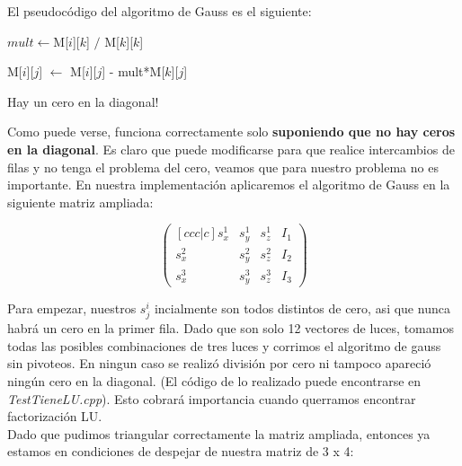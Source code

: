 El pseudocódigo del algoritmo de Gauss es el siguiente:

\begin{algorithm}[H]
\begin{algorithmic}


                \State $mult \gets $M[$i$][$k$] $/$ M[$k$][$k$]

                    \State M[$i$][$j$] $\gets$ M[$i$][$j$] - mult*M[$k$][$j$]

                \EndFor
            \Else
                \State Hay un cero en la diagonal!
            \EndIf
        \EndFor
    \EndFor

\EndFunction
\end{algorithmic}
\end{algorithm}

Como puede verse, funciona correctamente solo \textbf{suponiendo que no hay ceros en la diagonal}. Es claro que puede modificarse para que realice intercambios de filas y no tenga el problema del cero, veamos que para nuestro problema no es importante. En nuestra implementación aplicaremos el algoritmo de Gauss en la siguiente matriz ampliada:

\[
\begin{pmatrix}[ccc|c]
    s_{x}^{1} & s_{y}^{1} & s_{z}^{1} & I_{1} \\
    s_{x}^{2} & s_{y}^{2} & s_{z}^{2} & I_{2} \\
    s_{x}^{3} & s_{y}^{3} & s_{z}^{3} & I_{3}
\end{pmatrix}
\]

Para empezar, nuestros $s_{j}^{i}$ incialmente son todos distintos de cero, asi que nunca habrá un cero en la primer fila. Dado que son solo 12 vectores de luces, tomamos todas las posibles combinaciones de tres luces y corrimos el algoritmo de gauss sin pivoteos. En ningun caso se realizó división por cero ni tampoco apareció ningún cero en la diagonal. (El código de lo realizado puede encontrarse en \textit{TestTieneLU.cpp}). Esto cobrará importancia cuando querramos encontrar factorización LU. \\

Dado que pudimos triangular correctamente la matriz ampliada, entonces ya estamos en condiciones de despejar de nuestra matriz de 3 x 4:

